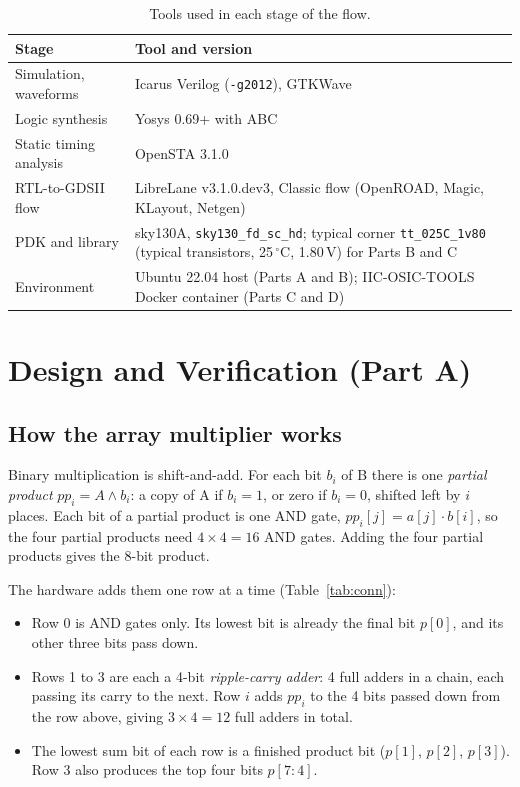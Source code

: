 \documentclass[10pt,a4paper,twocolumn]{article}
\begin{document}
\begin{table}[!htbp]
\centering\footnotesize
\begin{tabularx}{\columnwidth}{>{\raggedright\arraybackslash}p{2.5cm}L}
\toprule
\textbf{Stage} & \textbf{Tool and version} \\
\midrule
Simulation, waveforms & Icarus Verilog (\texttt{-g2012}), GTKWave \\
Logic synthesis & Yosys 0.69+ with ABC \\
Static timing analysis & OpenSTA 3.1.0 \\
RTL-to-GDSII flow & LibreLane v3.1.0.dev3, Classic flow (OpenROAD, Magic, KLayout, Netgen) \\
PDK and library & sky130A, \texttt{sky130\_fd\_sc\_hd}; typical corner \texttt{tt\_025C\_1v80} (typical transistors, 25\,$^\circ$C, 1.80\,V) for Parts B and C \\
Environment & Ubuntu 22.04 host (Parts A and B); IIC-OSIC-TOOLS Docker container (Parts C and D) \\
\bottomrule
\end{tabularx}
\caption{Tools used in each stage of the flow.}
\label{tab:tools}
\end{table}

\section{Design and Verification (Part A)}

\subsection{How the array multiplier works}
Binary multiplication is shift-and-add. For each bit $b_i$ of B there is one \emph{partial product} $pp_i = A \wedge b_i$: a copy of A if $b_i = 1$, or zero if $b_i = 0$, shifted left by $i$ places. Each bit of a partial product is one AND gate, $pp_i[j] = a[j]\cdot b[i]$, so the four partial products need $4 \times 4 = 16$ AND gates. Adding the four partial products gives the 8-bit product.

The hardware adds them one row at a time (Table~\ref{tab:conn}):
\begin{itemize}
  \item Row 0 is AND gates only. Its lowest bit is already the final bit $p[0]$, and its other three bits pass down.
  \item Rows 1 to 3 are each a 4-bit \emph{ripple-carry adder}: 4 full adders in a chain, each passing its carry to the next. Row $i$ adds $pp_i$ to the 4 bits passed down from the row above, giving $3 \times 4 = 12$ full adders in total.
  \item The lowest sum bit of each row is a finished product bit ($p[1]$, $p[2]$, $p[3]$). Row 3 also produces the top four bits $p[7{:}4]$.
\end{itemize}
\end{document}
